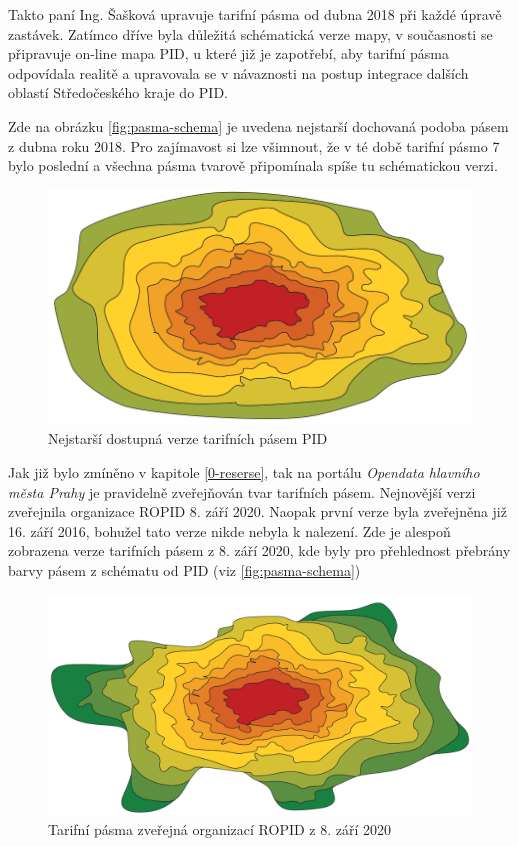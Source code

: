 Takto paní Ing. Šašková upravuje tarifní pásma od dubna 2018 při každé úpravě zastávek. 
Zatímco dříve byla důležitá schématická verze mapy, v současnosti se připravuje on-line mapa PID, u které již je zapotřebí, 
aby tarifní pásma odpovídala realitě a upravovala se v návaznosti na postup
integrace dalších oblastí Středočeského kraje do PID.

Zde na obrázku \ref{fig:pasma-schema} je uvedena nejstarší dochovaná podoba pásem z dubna roku 2018.
Pro zajímavost si lze všimnout, že v té době tarifní pásmo 7 bylo poslední a všechna pásma tvarově připomínala
spíše tu schématickou verzi.

\begin{figure}[H] \centering
    \includegraphics[width=400pt]{./pictures/pasma-nejstarsi.png}
    \caption[Nejstarší dostupná verze tarifních pásem PID]{Nejstarší dostupná verze tarifních pásem PID}
	\label{fig:pasma-nejstarsi}                                
\end{figure}

Jak již bylo zmíněno v kapitole \ref{0-reserse}, tak na portálu \textit{Opendata hlavního města Prahy}
je pravidelně zveřejňován tvar tarifních pásem. Nejnovější verzi zveřejnila organizace ROPID 8. září 2020.
Naopak první verze byla zveřejněna již 16. září 2016, bohužel tato verze nikde nebyla k nalezení.
Zde je alespoň zobrazena verze tarifních pásem z 8. září 2020, kde byly pro přehlednost 
přebrány barvy pásem z schématu od PID (viz \ref{fig:pasma-schema})

\begin{figure}[H] \centering
    \includegraphics[width=400pt]{./pictures/pasma-ROPID.png}
    \caption[Tarifní pásma zveřejná organizací ROPID z 8. září 2020]{Tarifní pásma zveřejná organizací ROPID z 8. září 2020}
	\label{fig:pasma-ROPID}                                
\end{figure}


